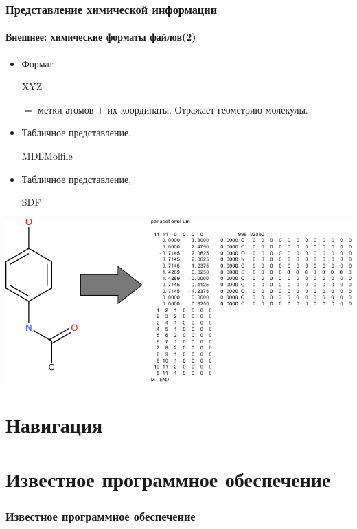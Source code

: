 \begin{frame}
  \frametitle{Представление химической информации}
  \framesubtitle{Внешнее: химические форматы файлов(2)}
  \begin{itemize}
    \item Формат \begin{tt}XYZ\end{tt} $=$ метки атомов $+$ их координаты. Отражает геометрию молекулы.
    \item Табличное представление, \begin{tt}MDL\footnotemark Molfile\end{tt} 
    \item Табличное представление, \begin{tt}SDF\end{tt}\footnotemark {}
  \end{itemize}
  \begin{center}
   \includegraphics[scale=0.70]{images/parac.pdf}
  \end{center}
\end{frame}

\section{Навигация}

\begin{frame}
  
\end{frame}

\section{Известное программное обеспечение}
\begin{frame}
  \frametitle{Известное программное обеспечение}
\end{frame}

